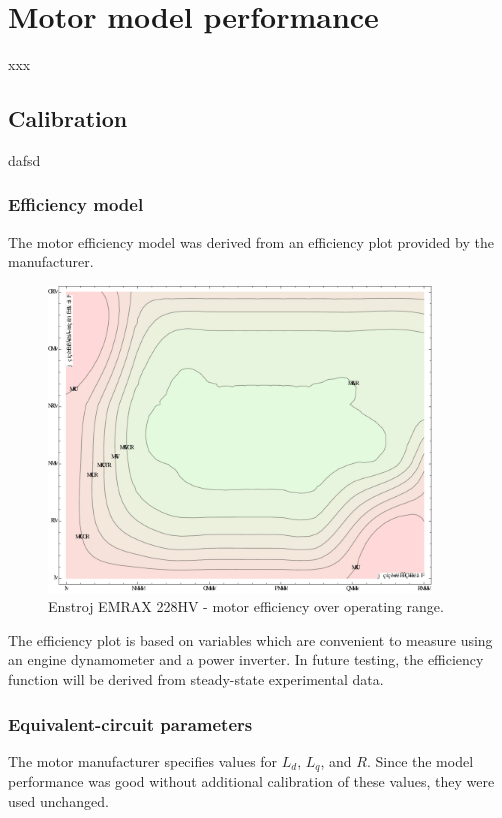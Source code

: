 \documentclass[../SimBALink.tex]{subfiles}
\begin{document}
\section{Motor model performance}
	xxx
	\subsection{Calibration}
		dafsd
		
		\subsubsection{Efficiency model}
			The motor efficiency model was derived from an efficiency plot provided by the manufacturer. 
			
			\begin{figure}[h]
				\centering
				\includegraphics[width=4in]{../Model/Powertrain/Motor/Documentation/Figures/EMRAX_228HV_efficiency}
				\caption{Enstroj EMRAX 228HV - motor efficiency over operating range.}
			\end{figure}
			\FloatBarrier
			
			The efficiency plot is based on variables which are convenient to measure using an engine dynamometer and a power inverter. In future testing, the efficiency function will be derived from steady-state experimental data.
			
		\subsubsection{Equivalent-circuit parameters}
			The motor manufacturer specifies values for $L_d$, $L_q$, and $R$. Since the model performance was good without additional calibration of these values, they were used unchanged.
			
\end{document}
